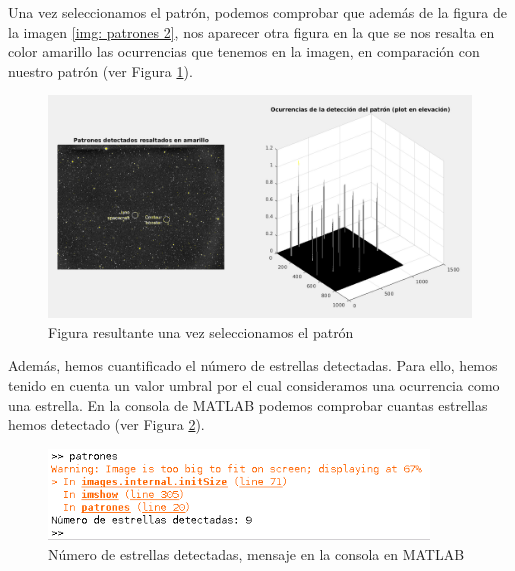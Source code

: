 \documentclass[12pt]{article}
\begin{document}
	\noindent Una vez seleccionamos el patrón, podemos comprobar que además de la figura de la imagen \ref{img: patrones 2}, nos aparecer otra figura en la que se nos resalta en color amarillo las ocurrencias que tenemos en la imagen, en comparación con nuestro patrón (ver Figura \ref{img: patrones 3}). 
	
	\begin{figure}[h!]
		\begin{center}
			\includegraphics[width=1\textwidth]{img/patrones_3.png}
			\caption{Figura resultante una vez seleccionamos el patrón}
			\label{img: patrones 3}
		\end{center}
	\end{figure}

	\pagebreak
	
	\noindent Además, hemos cuantificado el número de estrellas detectadas. Para ello, hemos tenido en cuenta un valor umbral por el cual consideramos una ocurrencia como una estrella. En la consola de MATLAB podemos comprobar cuantas estrellas hemos detectado (ver Figura \ref{img: patrones 4}).

	\begin{figure}[h]
		\begin{center}
			\includegraphics[width=0.9\textwidth]{img/patrones_4.png}
			\caption{Número de estrellas detectadas, mensaje en la consola en MATLAB }
			\label{img: patrones 4}
		\end{center}
	\end{figure}
	
	\pagebreak
	
\end{document}
